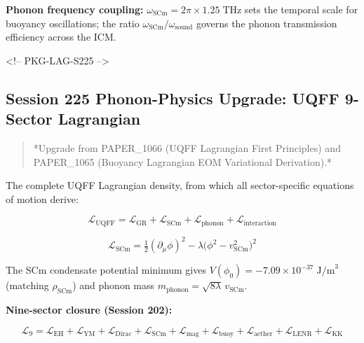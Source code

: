 \documentclass[12pt,a4paper]{article}
\begin{document}
\textbf{Phonon frequency coupling:} $\omega_{\text{SCm}} = 2\pi \times 1.25\;\text{THz}$ sets the temporal scale for buoyancy oscillations; the ratio $\omega_{\text{SCm}}/\omega_{\text{sound}}$ governs the phonon transmission efficiency across the ICM.

<!-- PKG-LAG-S225 -->

\subsection{Session 225 Phonon-Physics Upgrade: UQFF 9-Sector Lagrangian}

\begin{quote}
*Upgrade from PAPER\_1066 (UQFF Lagrangian First Principles) and
PAPER\_1065 (Buoyancy Lagrangian EOM Variational Derivation).*
\end{quote}

The complete UQFF Lagrangian density, from which all sector-specific equations of motion derive:

\begin{equation}
\mathcal{L}_{\text{UQFF}} = \mathcal{L}_{\text{GR}} + \mathcal{L}_{\text{SCm}} + \mathcal{L}_{\text{phonon}} + \mathcal{L}_{\text{interaction}}
\end{equation}

\begin{equation}
\mathcal{L}_{\text{SCm}} = \tfrac{1}{2}(\partial_\mu \phi)^2 - \lambda\bigl(\phi^2 - v_{\text{SCm}}^2\bigr)^2
\end{equation}

The SCm condensate potential minimum gives $V(\phi_0) = -7.09 \times 10^{-37}\;\text{J/m}^3$ (matching $\rho_{\text{SCm}}$) and phonon mass $m_{\text{phonon}} = \sqrt{8\lambda}\,v_{\text{SCm}}$.

\textbf{Nine-sector closure (Session 202):}

\begin{equation}
\mathcal{L}_{9} = \mathcal{L}_{\text{EH}} + \mathcal{L}_{\text{YM}} + \mathcal{L}_{\text{Dirac}} + \mathcal{L}_{\text{SCm}} + \mathcal{L}_{\text{mag}} + \mathcal{L}_{\text{buoy}} + \mathcal{L}_{\text{aether}} + \mathcal{L}_{\text{LENR}} + \mathcal{L}_{\text{KK}}
\end{equation}
\end{document}
